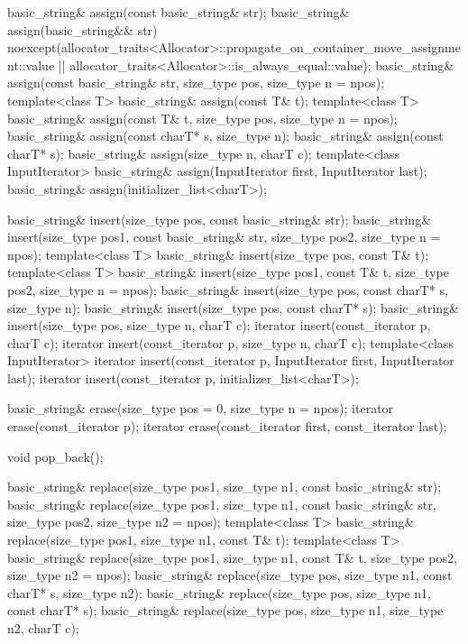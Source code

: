 \begin{codeblock}
{{    basic_string& assign(const basic_string& str);
    basic_string& assign(basic_string&& str)
      noexcept(allocator_traits<Allocator>::propagate_on_container_move_assignment::value ||
               allocator_traits<Allocator>::is_always_equal::value);
    basic_string& assign(const basic_string& str, size_type pos, size_type n = npos);
    template<class T>
      basic_string& assign(const T& t);
    template<class T>
      basic_string& assign(const T& t, size_type pos, size_type n = npos);
    basic_string& assign(const charT* s, size_type n);
    basic_string& assign(const charT* s);
    basic_string& assign(size_type n, charT c);
    template<class InputIterator>
      basic_string& assign(InputIterator first, InputIterator last);
    basic_string& assign(initializer_list<charT>);

    basic_string& insert(size_type pos, const basic_string& str);
    basic_string& insert(size_type pos1, const basic_string& str,
                         size_type pos2, size_type n = npos);
    template<class T>
      basic_string& insert(size_type pos, const T& t);
    template<class T>
      basic_string& insert(size_type pos1, const T& t, size_type pos2, size_type n = npos);
    basic_string& insert(size_type pos, const charT* s, size_type n);
    basic_string& insert(size_type pos, const charT* s);
    basic_string& insert(size_type pos, size_type n, charT c);
    iterator insert(const_iterator p, charT c);
    iterator insert(const_iterator p, size_type n, charT c);
    template<class InputIterator>
      iterator insert(const_iterator p, InputIterator first, InputIterator last);
    iterator insert(const_iterator p, initializer_list<charT>);

    basic_string& erase(size_type pos = 0, size_type n = npos);
    iterator erase(const_iterator p);
    iterator erase(const_iterator first, const_iterator last);

    void pop_back();

    basic_string& replace(size_type pos1, size_type n1, const basic_string& str);
    basic_string& replace(size_type pos1, size_type n1, const basic_string& str,
                          size_type pos2, size_type n2 = npos);
    template<class T>
      basic_string& replace(size_type pos1, size_type n1, const T& t);
    template<class T>
      basic_string& replace(size_type pos1, size_type n1, const T& t,
                            size_type pos2, size_type n2 = npos);
    basic_string& replace(size_type pos, size_type n1, const charT* s, size_type n2);
    basic_string& replace(size_type pos, size_type n1, const charT* s);
    basic_string& replace(size_type pos, size_type n1, size_type n2, charT c);

}}
\end{codeblock}
